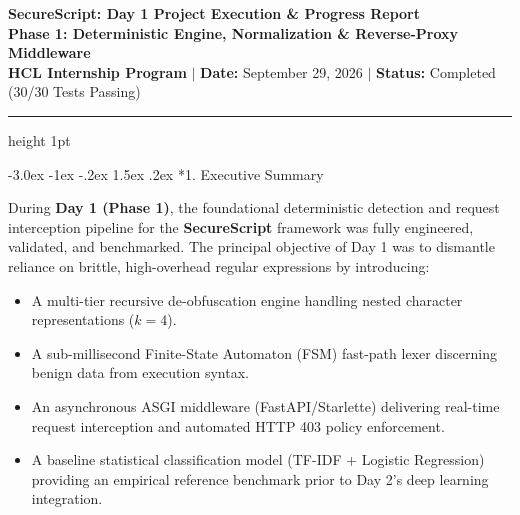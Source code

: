 \documentclass[11pt,a4paper]{article}
\makeatletter
\renewcommand{\section}{\@startsection{section}{1}{\z@}%
  {-3.0ex \@plus -1ex \@minus -.2ex}%
  {1.5ex \@plus .2ex}%
  {\normalfont\large\bfseries\color{primaryblue}}}
\makeatother
\begin{document}
\begin{center}
    {\LARGE \textbf{\color{primaryblue} SecureScript: Day 1 Project Execution \& Progress Report}} \\[0.8em]
    {\large \textbf{Phase 1: Deterministic Engine, Normalization \& Reverse-Proxy Middleware}} \\[0.5em]
    {\small \textbf{HCL Internship Program} \quad $\vert$ \quad \textbf{Date:} September 29, 2026 \quad $\vert$ \quad \textbf{Status:} Completed (30/30 Tests Passing)}
\end{center}

\vspace{0.3em}
\hrule height 1pt
\vspace{1.2em}

\section*{1. Executive Summary}

During \textbf{Day 1 (Phase 1)}, the foundational deterministic detection and request interception pipeline for the \textbf{SecureScript} framework was fully engineered, validated, and benchmarked. The principal objective of Day 1 was to dismantle reliance on brittle, high-overhead regular expressions by introducing:
\begin{itemize}[leftmargin=1.5em]
    \item A multi-tier recursive de-obfuscation engine handling nested character representations ($k=4$).
    \item A sub-millisecond Finite-State Automaton (FSM) fast-path lexer discerning benign data from execution syntax.
    \item An asynchronous ASGI middleware (FastAPI/Starlette) delivering real-time request interception and automated HTTP 403 policy enforcement.
    \item A baseline statistical classification model (TF-IDF + Logistic Regression) providing an empirical reference benchmark prior to Day 2's deep learning integration.
\end{itemize}
\end{document}
